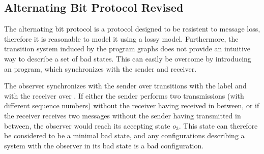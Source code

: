 \subsection{Alternating Bit Protocol Revised}
The alternating bit protocol is a protocol designed to be resistent to message loss, therefore it is reasonable to model it using a lossy model. Furthermore, the transition system induced by the program graphs  does not provide an intuitive way to describe a set  of bad states. This can easily be overcome by introducing an  program, which synchronizes with the sender and receiver.

\begin{figure}[h!]
\abpobserver
\label{abpobserver}
\end{figure}
The observer synchronizes with the sender over transitions with the label  and with the receiver over . If either the sender performs two transmissions (with different sequence numbers) without the receiver having received in between, or if the receiver receives two messages without the sender having transmitted in between, the observer would reach its accepting state $o_3$. This state can therefore be considered to be a minimal bad state, and any configurations describing a system with the observer in its bad state is a bad configuration.
